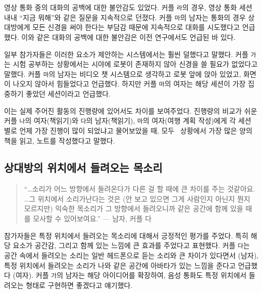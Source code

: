 영상 통화 중의 대화의 공백에 대한 불안감도 있었다. 커플 \texttt{라}의 경우, 영상 통화 세션 내내 ``지금 뭐해''와 같은 질문을 지속적으로 던졌다. 커플 \texttt{마}의 남자는 통화의 경우 상대방에게 모든 신경을 써야 한다는 부담감 때문에 지속적으로 대화를 시도했다고 언급했다. 이와 같은 대화의 공백에 대한 불안감은 이전 연구\cite{mclaughlin1982awkward}에서도 언급된 바 있다.

일부 참가자들은 이러한 요소가 제안하는 \sysname 시스템에서는 훨씬 덜했다고 말했다. 커플 \texttt{가}는 시험 공부하는 상황에서는 시야에 로봇이 존재하지 않아 신경을 쓸 필요가 없었다고 말했다. 커플 \texttt{마}의 남자는 \sysname\을 비디오 챗 시스템으로 생각하고 로봇 앞에 앉아 있었고, 화면이 나오지 않아서 힘들었다고 언급했다. 하지만 커플 \texttt{마}의 여자는 해당 세션이 가장 집중하기 좋았던 세션이라고 언급했다.

이는 실제 주어진 활동의 진행량에 있어서도 차이를 보여주었다. 진행량의 비교가 쉬운 커플 \texttt{나}의 여자(책읽기)와 \texttt{다}의 남자(책읽기), \texttt{마}의 여자(여행 계획 작성)에게 각 세션 별로 언제 가장 진행이 많이 되었냐고 물어보았을 때, 모두 \sysname\ 상황에서 가장 많은 양의 책을 읽고, 노트를 작성했다고 말했다.



\subsection{상대방의 위치에서 들려오는 목소리}

\begin{quote}
``\ldots 소리가 어느 방향에서 들려온다가 다른 걸 할 때에 큰 차이를 주는 것같아요. \ldots 그 위치에서 소리가난다는 것은 (안 보고 있으면 그게 사람인지 아닌지 뭔지 모르지만) 익숙한 목소리가 그 방향에서 들려오니까 같은 공간에 함께 있을 때를 모사할 수 있어보여요.'' --- 남자, 커플 다
\end{quote}

참가자들은 특정 위치에서 들려오는 목소리에 대해서 긍정적인 평가를 주었다. 특히 해당 요소가 공간감, 그리고 함께 있는 느낌에 큰 효과를 주었다고 표현했다. 커플 \texttt{다}는 공간 속에서 들려오는 소리는 일반 헤드폰으로 듣는 소리와 큰 차이가 있다면서 (남자), 특정 위치에서 들려오는 소리가 나와 같은 공간에 아바타가 있는 느낌을 준다고 언급했다 (여자). 커플 \texttt{가}의 남자는 해당 아이디어를 확장하여, 음성 통화도 특정 위치에서 들려오는 형태로 구현하면 좋겠다고 얘기했다.

